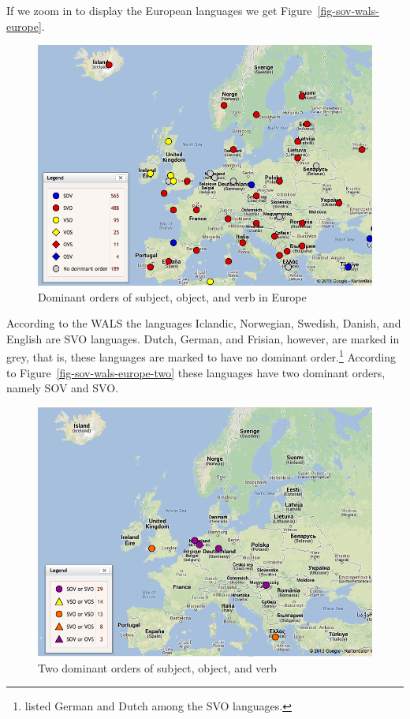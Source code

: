 If we zoom in to display the European languages we get Figure~\vref{fig-sov-wals-europe}.
\begin{figure}
\includegraphics[width=.898\textwidth]{Pictures/WALS-SOV-Europa}
\caption{\label{fig-sov-wals-europe}Dominant orders of subject, object, and verb in Europe}
\end{figure}
According to the WALS the languages Iclandic, Norwegian, Swedish, Danish, and English are SVO
languages. Dutch, German, and Frisian, however, are marked in grey, that is, these languages are
marked to have no dominant order.\footnote{
  \citet[]{Greenberg63a-u} listed German and Dutch among the SVO languages.%
} According to Figure~\vref{fig-sov-wals-europe-two} these languages
have two dominant orders, namely SOV and SVO.
\begin{figure}
\includegraphics[width=.898\textwidth]{Pictures/WALS-SOV-Europa-no-dominant}
\caption{\label{fig-sov-wals-europe-two}%
Two dominant orders of subject, object, and verb \citep[Section~3]{Dryer2013c}}
\end{figure}
